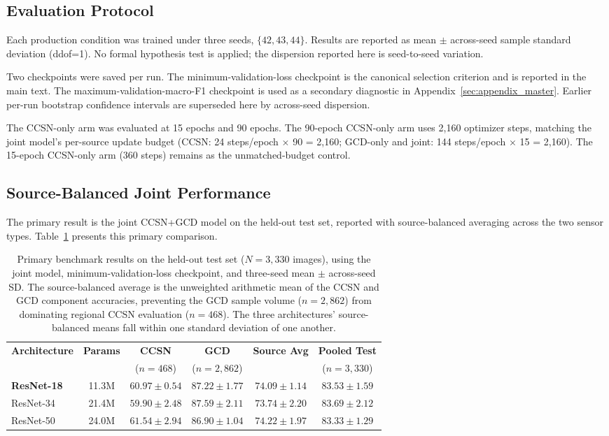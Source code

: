 \documentclass[11pt,a4paper]{article}
\begin{document}
\subsection{Evaluation Protocol}

Each production condition was trained under three seeds, $\{42,43,44\}$. Results are reported as mean $\pm$ across-seed sample standard deviation (ddof=1). No formal hypothesis test is applied; the dispersion reported here is seed-to-seed variation.

Two checkpoints were saved per run. The minimum-validation-loss checkpoint is the canonical selection criterion and is reported in the main text. The maximum-validation-macro-F1 checkpoint is used as a secondary diagnostic in Appendix~\ref{sec:appendix_master}. Earlier per-run bootstrap confidence intervals are superseded here by across-seed dispersion.

The CCSN-only arm was evaluated at 15 epochs and 90 epochs. The 90-epoch CCSN-only arm uses 2,160 optimizer steps, matching the joint model's per-source update budget (CCSN: 24 steps/epoch $\times$ 90 = 2,160; GCD-only and joint: 144 steps/epoch $\times$ 15 = 2,160). The 15-epoch CCSN-only arm (360 steps) remains as the unmatched-budget control.

\subsection{Source-Balanced Joint Performance}

The primary result is the joint CCSN+GCD model on the held-out test set, reported with source-balanced averaging across the two sensor types. Table~\ref{tab:primary_results} presents this primary comparison.

\begin{table}[!htbp]
\centering
\setlength{\tabcolsep}{8pt}
\begin{tabular}{lccccc}
\toprule
\textbf{Architecture} & \textbf{Params} & \textbf{CCSN} & \textbf{GCD} & \textbf{Source Avg} & \textbf{Pooled Test} \\
 & & ($n=468$) & ($n=2,862$) & & ($n=3,330$) \\
\midrule
\textbf{ResNet-18} & 11.3M & $60.97 \pm 0.54$ & $87.22 \pm 1.77$ & $\mathbf{74.09 \pm 1.14}$ & $83.53 \pm 1.59$ \\
ResNet-34 & 21.4M & $59.90 \pm 2.48$ & $87.59 \pm 2.11$ & $73.74 \pm 2.20$ & $83.69 \pm 2.12$ \\
ResNet-50 & 24.0M & $61.54 \pm 2.94$ & $86.90 \pm 1.04$ & $74.22 \pm 1.97$ & $83.33 \pm 1.29$ \\
\bottomrule
\end{tabular}
\caption{Primary benchmark results on the held-out test set ($N=3,330$ images), using the joint model, minimum-validation-loss checkpoint, and three-seed mean $\pm$ across-seed SD. The source-balanced average is the unweighted arithmetic mean of the CCSN and GCD component accuracies, preventing the GCD sample volume ($n=2,862$) from dominating regional CCSN evaluation ($n=468$). The three architectures' source-balanced means fall within one standard deviation of one another.}
\label{tab:primary_results}
\end{table}
\end{document}
